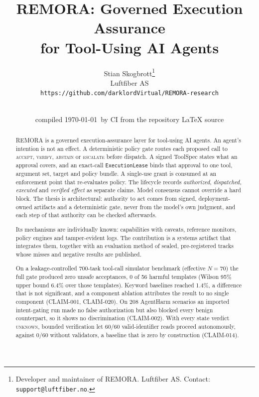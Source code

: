 \documentclass[10pt,twocolumn]{article}
\title{REMORA: Governed Execution Assurance\\for Tool-Using AI Agents}
\author{
  Stian Skogbrott\thanks{Developer and maintainer of REMORA. Luftfiber AS.
  Contact: \texttt{support@luftfiber.no}.}\\
  Luftfiber AS\\
  \texttt{https://github.com/darklordVirtual/REMORA-research}
}
\date{\paperversion\\ \small compiled \today\ by CI from the repository LaTeX source}
\begin{document}
\maketitle

\begin{abstract}
REMORA is a governed execution-assurance layer for tool-using AI agents.
An agent's intention is not an effect. A deterministic policy gate routes
each proposed call to \textsc{accept}, \textsc{verify}, \textsc{abstain} or
\textsc{escalate} before dispatch. A signed ToolSpec states what an approval
covers, and an exact-call \texttt{ExecutionLease} binds that approval to one
tool, argument set, target and policy bundle. A single-use grant is consumed
at an enforcement point that re-evaluates policy. The lifecycle records
\emph{authorized}, \emph{dispatched}, \emph{executed} and \emph{verified
effect} as separate claims. Model consensus cannot override a hard block.
The thesis is architectural: authority to act comes from signed,
deployment-owned artifacts and a deterministic gate, never from the model's
own judgment, and each step of that authority can be checked afterwards.

Its mechanisms are individually known: capabilities with caveats, reference
monitors, policy engines and tamper-evident logs. The contribution is a
systems artifact that integrates them, together with an evaluation method of
sealed, pre-registered tracks whose misses and negative results are published.

On a leakage-controlled 700-task tool-call simulator benchmark (effective
$N=70$) the full gate produced zero unsafe acceptances, 0 of 56 harmful
templates (Wilson 95\% upper bound 6.4\% over those templates). Keyword baselines reached 1.4\%, a difference that is not
significant, and a component ablation attributes the result to no single
component (CLAIM-001, CLAIM-020). On 208 AgentHarm scenarios
\cite{andriushchenko2024agentharm} an imported intent-gating run made no
false authorization but also blocked every benign counterpart, so it shows no
discrimination (CLAIM-002). With every state verdict \textsc{unknown},
bounded verification let 60/60 valid-identifier reads proceed autonomously,
against 0/60 without validators, a baseline that is zero by construction
(CLAIM-014).


\end{abstract}
\end{document}
